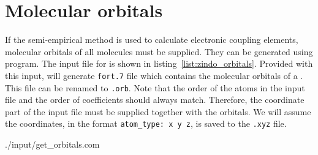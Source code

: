 \section{Molecular orbitals}
If the semi-empirical method is used to calculate electronic coupling elements, molecular orbitals of all molecules must be supplied. They can be generated using \gaussian program. The \gaussian input file for \dcvt is shown in listing~\ref{list:zindo_orbitals}. Provided with this input, \gaussian will generate \texttt{fort.7} file which contains the molecular orbitals of a \dcvt. This file can be renamed to \texttt{\dcvt.orb}. Note that the order of the atoms in the input file and the order of coefficients should always match. Therefore, the coordinate part of the input file must be supplied together with the orbitals. We will assume the coordinates, in the format \texttt{atom\_type: x y z}, is saved to the \texttt{\dcvt.xyz} file.


%
{./input/get_orbitals.com}
%


